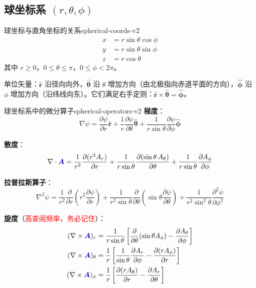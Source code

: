 \documentclass[11pt,a4paper,openany,oneside]{book}
\newcommand{\vecA}{\textcolor{blue!70!black}{\vect{A}}}
\newcommand{\vect}[1]{\bm{#1}}
\newcommand{\unitvec}[1]{\hat{\vect{#1}}}
\newcommand{\grad}{\nabla}
\newcommand{\curl}{\nabla\times}
\newcommand{\divg}{\nabla\cdot}
\newcommand{\lap}{\nabla^2}
\begin{document}
\subsection{球坐标系 \texorpdfstring{$(r, \theta, \phi)$}{(r, θ, φ)}}

\begin{definition}{球坐标与直角坐标的关系}{spherical-coords-v2}
\begin{align*}
x &= r\sin\theta\cos\phi \\
y &= r\sin\theta\sin\phi \\
z &= r\cos\theta
\end{align*}
其中 $r \geq 0$，$0 \leq \theta \leq \pi$，$0 \leq \phi < 2\pi$。

单位矢量：$\unitvec{r}$ 沿径向向外，$\unitvec{\theta}$ 沿 $\theta$ 增加方向（由北极指向赤道平面的方向），$\unitvec{\phi}$ 沿 $\phi$ 增加方向（沿纬线向东）。它们满足右手定则：$\unitvec{r} \times \unitvec{\theta} = \unitvec{\phi}$。
\end{definition}

\begin{theorem}{球坐标系中的微分算子}{spherical-operators-v2}
\textbf{梯度}：
\[
\grad\psi = \frac{\partial\psi}{\partial r}\unitvec{r} + \frac{1}{r}\frac{\partial\psi}{\partial\theta}\unitvec{\theta} + \frac{1}{r\sin\theta}\frac{\partial\psi}{\partial\phi}\unitvec{\phi}
\]

\textbf{散度}：
\[
\divg\vecA = \frac{1}{r^2}\frac{\partial(r^2 A_r)}{\partial r} + \frac{1}{r\sin\theta}\frac{\partial(\sin\theta \, A_\theta)}{\partial\theta} + \frac{1}{r\sin\theta}\frac{\partial A_\phi}{\partial\phi}
\]

\textbf{拉普拉斯算子}：
\[
\lap\psi = \frac{1}{r^2}\frac{\partial}{\partial r}\left(r^2\frac{\partial\psi}{\partial r}\right) + \frac{1}{r^2\sin\theta}\frac{\partial}{\partial\theta}\left(\sin\theta\frac{\partial\psi}{\partial\theta}\right) + \frac{1}{r^2\sin^2\theta}\frac{\partial^2\psi}{\partial\phi^2}
\]

\textbf{旋度}（\textcolor{red}{高查阅频率，务必记住}）：
\begin{align*}
(\curl\vecA)_r &= \frac{1}{r\sin\theta}\left[\frac{\partial}{\partial\theta}(\sin\theta A_\phi) - \frac{\partial A_\theta}{\partial\phi}\right] \\
(\curl\vecA)_\theta &= \frac{1}{r}\left[\frac{1}{\sin\theta}\frac{\partial A_r}{\partial\phi} - \frac{\partial(rA_\phi)}{\partial r}\right] \\
(\curl\vecA)_\phi &= \frac{1}{r}\left[\frac{\partial(rA_\theta)}{\partial r} - \frac{\partial A_r}{\partial\theta}\right]
\end{align*}
\end{theorem}
\end{document}
